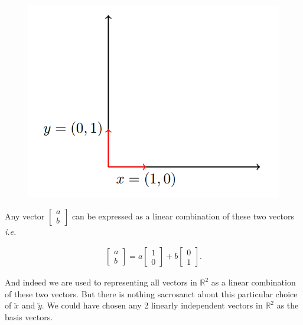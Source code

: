 \documentclass[11pt, a4paper]{article}
\begin{document}
\begin{figure}[!htbp]

\centering

\includegraphics[scale=0.5]{image_3.png}

\end{figure}

Any vector $\begin{bmatrix} a \\ b \end{bmatrix}$ can be expressed as a linear combination of these two vectors \textit{i.e.}

\begin{gather*}
\begin{bmatrix} a \\ b \end{bmatrix}
= 
a \begin{bmatrix} 1 \\ 0 \end{bmatrix}
+
b \begin{bmatrix} 0 \\ 1 \end{bmatrix}.
\end{gather*}

And indeed we are used to representing all vectors in $\mathbb{R}^2$ as a linear combination of these two vectors. But there is nothing sacrosanct about this particular choice of $\utilde{x}$ and $\utilde{y}$. 
We could have chosen any 2 linearly independent vectors in $\mathbb{R}^2$ as the basis vectors. \\

\vspace{0.3cm}
\end{document}
